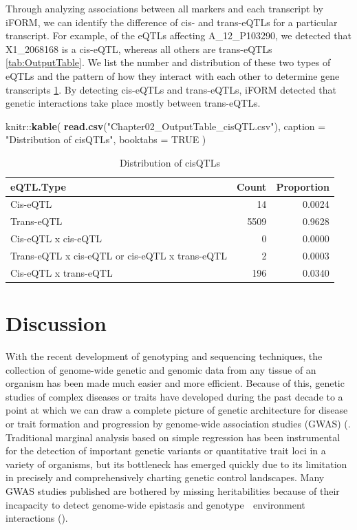 \documentclass[11pt,]{book}
\newenvironment{Shaded}{\begin{snugshade}}{\end{snugshade}}
\newcommand{\KeywordTok}[1]{\textcolor[rgb]{0.13,0.29,0.53}{\textbf{{#1}}}}
\newcommand{\DataTypeTok}[1]{\textcolor[rgb]{0.13,0.29,0.53}{{#1}}}
\newcommand{\StringTok}[1]{\textcolor[rgb]{0.31,0.60,0.02}{{#1}}}
\newcommand{\OtherTok}[1]{\textcolor[rgb]{0.56,0.35,0.01}{{#1}}}
\newcommand{\NormalTok}[1]{{#1}}
\theoremstyle{definition}
\theoremstyle{definition}
\theoremstyle{remark}
\begin{document}
Through analyzing associations between all markers and each transcript
by iFORM, we can identify the difference of cis- and trans-eQTLs for a
particular transcript. For example, of the eQTLs affecting
A\_12\_P103290, we detected that X1\_2068168 is a cis-eQTL, whereas all
others are trans-eQTLs \ref{tab:OutputTable}. We list the number and
distribution of these two types of eQTLs and the pattern of how they
interact with each other to determine gene transcripts \ref{tab:Table5}.
By detecting cis-eQTLs and trans-eQTLs, iFORM detected that genetic
interactions take place mostly between trans-eQTLs.

\begin{Shaded}
\begin{Highlighting}[]
\NormalTok{knitr::}\KeywordTok{kable}\NormalTok{(}
  \KeywordTok{read.csv}\NormalTok{(}\StringTok{"Chapter02_OutputTable_cisQTL.csv"}\NormalTok{), }
  \DataTypeTok{caption =} \StringTok{"Distribution of cisQTLs"}\NormalTok{,}
  \DataTypeTok{booktabs =} \OtherTok{TRUE}
\NormalTok{)}
\end{Highlighting}
\end{Shaded}

\begin{table}

\caption{\label{tab:Table5}Distribution of cisQTLs}
\centering
\begin{tabular}[t]{lrr}
\toprule
eQTL.Type & Count & Proportion\\
\midrule
Cis-eQTL & 14 & 0.0024\\
Trans-eQTL & 5509 & 0.9628\\
Cis-eQTL x cis-eQTL & 0 & 0.0000\\
Trans-eQTL x cis-eQTL or cis-eQTL x trans-eQTL & 2 & 0.0003\\
Cis-eQTL x trans-eQTL & 196 & 0.0340\\
\bottomrule
\end{tabular}
\end{table}

\section{Discussion}\label{discussion}

With the recent development of genotyping and sequencing techniques, the
collection of genome-wide genetic and genomic data from any tissue of an
organism has been made much easier and more efficient. Because of this,
genetic studies of complex diseases or traits have developed during the
past decade to a point at which we can draw a complete picture of
genetic architecture for disease or trait formation and progression by
genome-wide association studies (GWAS) (\cite{mackay2009genetics}.
Traditional marginal analysis based on simple regression has been
instrumental for the detection of important genetic variants or
quantitative trait loci in a variety of organisms, but its bottleneck
has emerged quickly due to its limitation in precisely and
comprehensively charting genetic control landscapes. Many GWAS studies
published are bothered by missing heritabilities because of their
incapacity to detect genome-wide epistasis and genotype  environment
interactions (\cite{manolio2009finding}).
\end{document}
